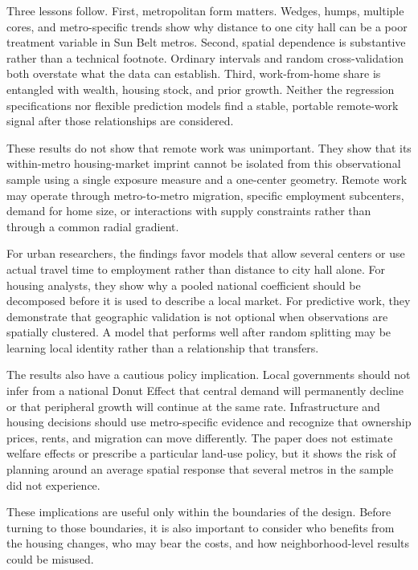 \documentclass[11pt]{article}
\begin{document}
Three lessons follow. First, metropolitan form matters. Wedges, humps, multiple cores, and metro-specific trends show why distance
to one city hall can be a poor treatment variable in Sun Belt metros. Second, spatial dependence is substantive rather than a
technical footnote. Ordinary intervals and random cross-validation both overstate what the data can establish. Third,
work-from-home share is entangled with wealth, housing stock, and prior growth. Neither the regression specifications nor flexible
prediction models find a stable, portable remote-work signal after those relationships are considered.

These results do not show that remote work was unimportant. They show that its within-metro housing-market imprint cannot be
isolated from this observational sample using a single exposure measure and a one-center geometry. Remote work may operate through
metro-to-metro migration, specific employment subcenters, demand for home size, or interactions with supply constraints rather than
through a common radial gradient.

For urban researchers, the findings favor models that allow several centers or use actual travel time to employment rather than
distance to city hall alone. For housing analysts, they show why a pooled national coefficient should be decomposed before it is
used to describe a local market. For predictive work, they demonstrate that geographic validation is not optional when observations
are spatially clustered. A model that performs well after random splitting may be learning local identity rather than a relationship
that transfers.

The results also have a cautious policy implication. Local governments should not infer from a national Donut Effect that central
demand will permanently decline or that peripheral growth will continue at the same rate. Infrastructure and housing decisions
should use metro-specific evidence and recognize that ownership prices, rents, and migration can move differently. The paper does
not estimate welfare effects or prescribe a particular land-use policy, but it shows the risk of planning around an average spatial
response that several metros in the sample did not experience.

These implications are useful only within the boundaries of the design. Before turning to those boundaries, it is also important
to consider who benefits from the housing changes, who may bear the costs, and how neighborhood-level results could be misused.
\end{document}
